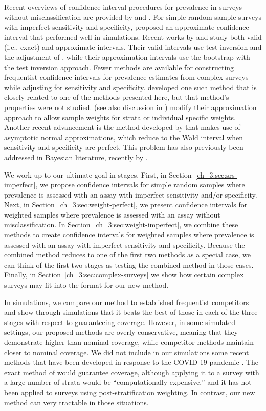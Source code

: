 Recent overviews of confidence interval procedures for prevalence in surveys without misclassification are provided by \citet{Dean:2015} and \citet{franco2019}.
For simple random sample surveys with imperfect sensitivity and specificity, \citet{Lang:2014} proposed an approximate confidence interval that performed well in simulations.
Recent works by \citet{DiCi:2021} and \citet{Cai:2020} study both valid (i.e., exact) and approximate intervals.
Their valid intervals use test inversion and the adjustment of \citep{Berg:1994}, while their approximation intervals use the bootstrap with the test inversion approach.
Fewer methods are available for constructing frequentist confidence intervals for prevalence estimates from complex surveys while adjusting for sensitivity and specificity.
\citet{Kali:2021} developed one such method that is closely related to one of the methods presented here, but that method's properties were not studied.
\citet{Cai:2020} (see also discussion in \citep{DiCi:2021}) modify their approximation approach to allow sample weights for strata or individual specific weights.
Another recent advancement is the method developed by \citet{rosin2021estimating} that makes use of asymptotic normal approximations, which reduce to the Wald interval when sensitivity and specificity are perfect.
This problem has also previously been addressed in Bayesian literature, recently by \citet{GelmanBayes}.

We work up to our ultimate goal in stages.
First, in Section~\ref{ch_3:sec:srs-imperfect}, we propose confidence intervals for simple random samples where prevalence is assessed with an assay with imperfect sensitivity and/or specificity.
Next, in Section~\ref{ch_3:sec:weight-perfect}, we present confidence intervals for weighted samples where prevalence is assessed with an assay without misclassification.
In Section~\ref{ch_3:sec:weight-imperfect}, we combine these methods to create confidence intervals for weighted samples where prevalence is assessed with an assay with imperfect sensitivity and specificity.
Because the combined method reduces to one of the first two methods as a special case, we can think of the first two stages as testing the combined method in those cases.
Finally, in Section~\ref{ch_3:sec:complex-surveys} we show how certain complex surveys may fit into the format for our new method.

In simulations, we compare our method to established frequentist competitors and show through simulations that it beats the best of those in each of the three stages with respect to guaranteeing coverage.
However, in some simulated settings, our proposed methods are overly conservative, meaning that they demonstrate higher than nominal coverage, while competitor methods maintain closer to nominal coverage.
We did not include in our simulations some recent methods that have been developed in response to the COVID-19 pandemic \citep{Cai:2020,DiCi:2021,rosin2021estimating}.
The exact method of \citep{DiCi:2021} would guarantee coverage, although applying it to a survey with a large number of strata would be ``computationally expensive,'' and it has not been applied to surveys using post-stratification weighting. In contrast, our new method can very tractable in those situations.


